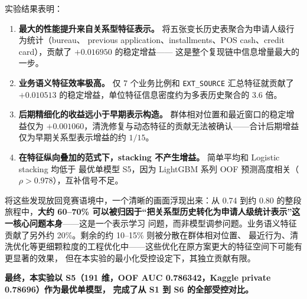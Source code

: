 \documentclass[11pt,UTF8,fontset=windows]{ctexrep}
\begin{document}
实验结果表明：

\begin{enumerate}
\item \textbf{最大的性能提升来自关系型特征表示。} 将五张变长历史表聚合为申请人级行为统计（bureau、
previous application、installments、POS cash、credit card），贡献了 $+0.016950$ 的稳定增益——
这是整个复现链中信息增量最大的一步。
\item \textbf{业务语义特征效率极高。} 仅 7 个业务比例和 \texttt{EXT\_SOURCE} 汇总特征就贡献了
$+0.010513$ 的稳定增益，单位特征信息密度约为多表历史聚合的 3.6 倍。
\item \textbf{后期精细化的收益远小于早期表示构造。} 群体相对位置和最近窗口的稳定增益仅为
$+0.001060$，清洗修复与动态特征的贡献无法被确认——合计后期增益仅为早期关系型表示增益的约 $1/15$。
\item \textbf{在特征纵向叠加的范式下，stacking 不产生增益。} 简单平均和 Logistic stacking 均低于
最优单模型 S5，因为 LightGBM 系列 OOF 预测高度相关（$\rho > 0.978$），互补信号不足。
\end{enumerate}

将这些发现放回竞赛语境中，一个清晰的画面浮现出来：从 0.74 到约 0.80 的整段旅程中，\textbf{大约
60--70\% 可以被归因于“把关系型历史转化为申请人级统计表示”这一核心问题本身}——这是一个表示学习
问题，而非模型调参问题。业务语义特征贡献了另外约 20\%。剩余的约 10--15\% 则被分散在群体相对位置、
最近行为、清洗优化等更细颗粒度的工程优化中——这些优化在原方案更大的特征空间下可能有更显著的效果，
但在本实验的最小化受控设定下，其独立贡献有限。

\textbf{最终，本实验以 S5（191 维，OOF AUC 0.786342，Kaggle private 0.78696）作为最优单模型，}
\textbf{完成了从 S1 到 S6 的全部受控对比。}
\end{document}
